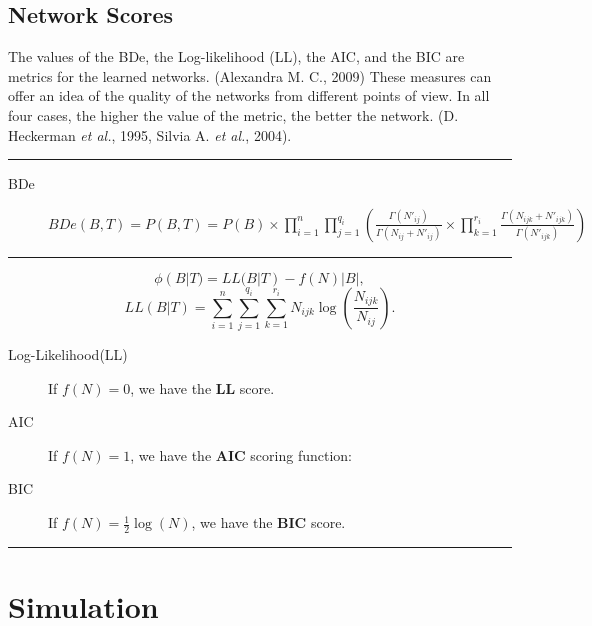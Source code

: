 \documentclass[runningheads,a4paper]{llncs}
\begin{document}
\subsection{Network Scores}

The values of the BDe, the Log-likelihood (LL), the AIC, and the BIC are metrics for the learned networks. {\scriptsize{}(Alexandra M. C., 2009)} These measures can offer an idea of the quality of the networks from different points of view. In all four cases, the higher the value of the metric, the better the network. {\scriptsize{}(D. Heckerman \emph{et al.}, 1995, Silvia A. \emph{et al.}, 2004)}.

\begin{center}\rule[0.5ex]{0.9\columnwidth}{1pt}\end{center}

\begin{description}
	\item[BDe]
	$BDe(B,T) = P(B,T)=P(B)\times\prod_{i=1}^{n}\prod_{j=1}^{q_{i}}(\frac{\Gamma(N'_{ij})}{\Gamma(N_{ij}+N'_{ij})}\times\prod_{k=1}^{r_{i}}\frac{\Gamma(N_{ijk}+N'_{ijk})}{\Gamma(N'_{ijk})})$
\end{description}

\begin{center}\rule[0.5ex]{0.9\columnwidth}{1pt}\end{center}
$$\phi(B|T) = LL(B|T) - f(N)|B|,$$
$$LL(B|T)=\sum_{i=1}^{n}\sum_{j=1}^{q_{i}}\sum_{k=1}^{r_{i}}N_{ijk}\log(\frac{N_{ijk}}{N_{ij}}).$$

\begin{description}
	\item[Log-Likelihood(LL)] If $f(N) = 0$, we have the \textbf{LL} score.
	
	\item[AIC] If $f(N) = 1$, we have the \textbf{AIC} scoring function:
	
	\item[BIC] If $f(N) = \frac{1}{2} \log(N)$, we have the \textbf{BIC} score.
\end{description}

\begin{center}\rule[0.5ex]{0.9\columnwidth}{1pt}\end{center}





\section{Simulation}
\end{document}
